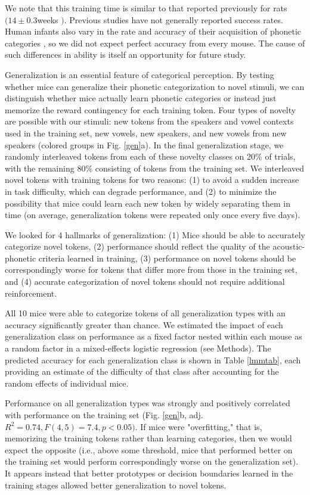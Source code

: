 We note that this training time is similar to that reported previously for rats $ (14\pm 0.3 $weeks \citep{Engineer2015}$) $. Previous studies have not generally reported success rates. Human infants also vary in the rate and accuracy of their acquisition of phonetic categories \citep{Werker1988}, so we did not expect perfect accuracy from every mouse. The cause of such differences in ability is itself an opportunity for future study.

Generalization is an essential feature of categorical perception. By testing whether mice can generalize their phonetic categorization to novel stimuli, we can distinguish whether mice actually learn phonetic categories or instead just memorize the reward contingency for each training token. Four types of novelty are possible with our stimuli: new tokens from the speakers and vowel contexts used in the training set, new vowels, new speakers, and new vowels from new speakers (colored groups in Fig. \ref{gen}a). In the final generalization stage, we randomly interleaved tokens from each of these novelty classes on 20\% of trials, with the remaining 80\% consisting of tokens from the training set. We interleaved novel tokens with training tokens for two reasons: (1) to avoid a sudden increase in task difficulty, which can degrade performance, and (2) to minimize the possibility that mice could learn each new token by widely separating them in time (on average, generalization tokens were repeated only once every five days).

We looked for 4 hallmarks of generalization: (1) Mice should be able to accurately categorize novel tokens, (2) performance should reflect the quality of the acoustic-phonetic criteria learned in training, (3) performance on novel tokens should be correspondingly worse for tokens that differ more from those in the training set, and (4) accurate categorization of novel tokens should not require additional reinforcement.

All 10 mice were able to categorize tokens of all generalization types with an accuracy significantly greater than chance. We estimated the impact of each generalization class on performance as a fixed factor nested within each mouse as a random factor in a mixed-effects logistic regression (see Methods). The predicted accuracy for each generalization class is shown in Table \ref{lmmtab}, each providing an estimate of the difficulty of that class after accounting for the random effects of individual mice.

Performance on all generalization types was strongly and positively correlated with performance on the training set (Fig. \ref{gen}b, adj. $R^2=0.74, F(4, 5) = 7.4, p < 0.05)$. If mice were "overfitting," that is, memorizing the training tokens rather than learning categories, then we would expect the opposite (i.e., above some threshold, mice that performed better on the training set would perform correspondingly worse on the generalization set). It appears instead that better prototypes or decision boundaries learned in the training stages allowed better generalization to novel tokens.


